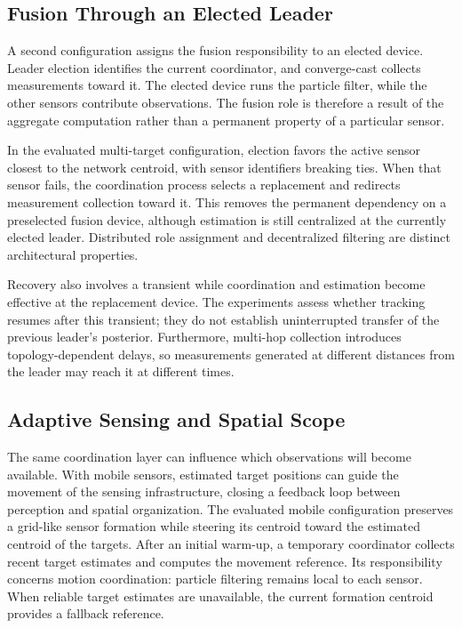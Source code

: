 \subsection{Fusion Through an Elected Leader}
\label{subsec:dpf-fusion}

A second configuration assigns the fusion responsibility to an elected device.
%
Leader election identifies the current coordinator, 
 and converge-cast collects measurements toward it.
%
The elected device runs the particle filter,
 while the other sensors contribute observations.
%
The fusion role is therefore a result of the aggregate computation 
 rather than a permanent property of a particular sensor.

In the evaluated multi-target configuration, 
 election favors the active sensor closest to the network centroid, 
 with sensor identifiers breaking ties.
%
When that sensor fails, 
 the coordination process selects a replacement 
 and redirects measurement collection toward it.
%
This removes the permanent dependency on a preselected fusion device, 
 although estimation is still centralized at the currently elected leader.
%
Distributed role assignment and decentralized filtering are 
 distinct architectural properties.

Recovery also involves a transient while coordination 
 and estimation become effective at the replacement device.
%
The experiments assess whether tracking resumes after this transient; 
 they do not establish uninterrupted transfer of the previous leader's posterior.
%
Furthermore, 
 multi-hop collection introduces topology-dependent delays, 
 so measurements generated at different distances from the leader 
 may reach it at different times.

\subsection{Adaptive Sensing and Spatial Scope}
\label{subsec:dpf-adaptation}

The same coordination layer can influence 
 which observations will become available.
%
With mobile sensors, 
 estimated target positions can guide the movement of the sensing infrastructure, 
 closing a feedback loop between perception and spatial organization.
%
The evaluated mobile configuration preserves a grid-like sensor formation 
 while steering its centroid toward the estimated centroid of the targets.
%
After an initial warm-up, 
 a temporary coordinator collects recent target estimates 
 and computes the movement reference.
%
Its responsibility concerns motion coordination: 
 particle filtering remains local to each sensor.
%
When reliable target estimates are unavailable, 
 the current formation centroid provides a fallback reference.


